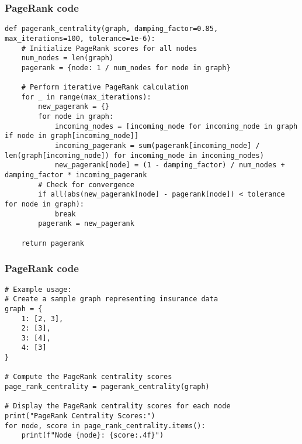 \begin{frame}[fragile]\frametitle{PageRank code}
{\tiny
\begin{lstlisting}
def pagerank_centrality(graph, damping_factor=0.85, max_iterations=100, tolerance=1e-6):
    # Initialize PageRank scores for all nodes
    num_nodes = len(graph)
    pagerank = {node: 1 / num_nodes for node in graph}

    # Perform iterative PageRank calculation
    for _ in range(max_iterations):
        new_pagerank = {}
        for node in graph:
            incoming_nodes = [incoming_node for incoming_node in graph if node in graph[incoming_node]]
            incoming_pagerank = sum(pagerank[incoming_node] / len(graph[incoming_node]) for incoming_node in incoming_nodes)
            new_pagerank[node] = (1 - damping_factor) / num_nodes + damping_factor * incoming_pagerank
        # Check for convergence
        if all(abs(new_pagerank[node] - pagerank[node]) < tolerance for node in graph):
            break
        pagerank = new_pagerank
		
    return pagerank

\end{lstlisting}
}

\end{frame}


\begin{frame}[fragile]\frametitle{PageRank code}
{\tiny
\begin{lstlisting}
# Example usage:
# Create a sample graph representing insurance data
graph = {
    1: [2, 3],
    2: [3],
    3: [4],
    4: [3]
}

# Compute the PageRank centrality scores
page_rank_centrality = pagerank_centrality(graph)

# Display the PageRank centrality scores for each node
print("PageRank Centrality Scores:")
for node, score in page_rank_centrality.items():
    print(f"Node {node}: {score:.4f}")

\end{lstlisting}
}

\end{frame}


